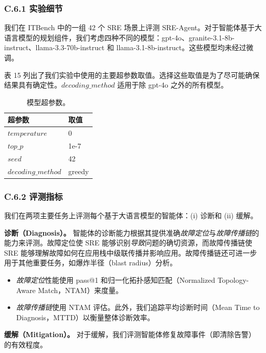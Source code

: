 \documentclass[10pt,UTF8,fontset=fandol]{ctexart}
\begin{document}
\subsubsection{C.6.1 实验细节}

我们在 ITBench 中的一组 42 个 SRE 场景上评测 SRE-Agent。对于智能体基于大语言模型的规划组件，我们考虑四种不同的模型：gpt-4o、granite-3.1-8b-instruct、llama-3.3-70b-instruct 和 llama-3.1-8b-instruct。这些模型均未经过微调。

表 15 列出了我们实验中使用的主要超参数取值。选择这些取值是为了尽可能确保结果具有确定性。$decoding\_method$ 适用于除 gpt-4o 之外的所有模型。

\begin{table}[H]
\centering
\caption{模型超参数。}
\label{tab:itb-tab15}
\begin{tabular}{ll}
\toprule
\textbf{超参数} & \textbf{取值} \\
\midrule
$temperature$ & 0 \\
$top\_p$ & 1e-7 \\
$seed$ & 42 \\
$decoding\_method$ & greedy \\
\bottomrule
\end{tabular}
\end{table}

\subsubsection{C.6.2 评测指标}

我们在两项主要任务上评测每个基于大语言模型的智能体：(i) 诊断和 (ii) 缓解。

\textbf{诊断（Diagnosis）。} 智能体的诊断能力根据其提供准确\emph{故障定位}与\emph{故障传播链}的能力来评测。故障定位使 SRE 能够识别\emph{导致}问题的确切资源，而故障传播链使 SRE 能够理解故障如何在应用栈中级联传播并影响应用。故障传播链还可进一步用于其他重要任务，如爆炸半径（blast radius）分析。

\begin{itemize}
\item \emph{故障定位}性能使用 pass@1 和归一化拓扑感知匹配（Normalized Topology-Aware Match，NTAM）来度量。
\item \emph{故障传播链}使用 NTAM 评估。此外，我们追踪平均诊断时间（Mean Time to Diagnosis，MTTD）以衡量整体诊断效率。
\end{itemize}

\textbf{缓解（Mitigation）。} 对于缓解，我们评测智能体修复故障事件（即清除告警）的有效程度。
\end{document}
